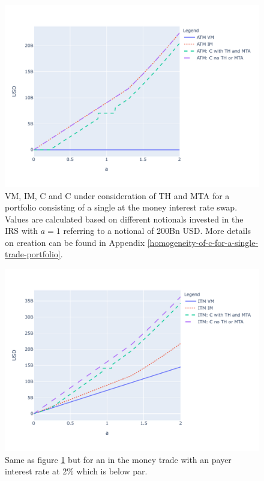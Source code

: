 \documentclass[../Thesis_AHoecherl.tex]{subfiles}
\begin{document}
    \begin{figure}
        \centering
        \includegraphics{Graphics/C_and_its_components_for_ATM_IRS.pdf}
        \caption{VM, IM, C and C under consideration of TH and MTA for a portfolio consisting of a single at the money interest rate swap. Values are calculated based on different notionals invested in the IRS with $a=1$ referring to a notional of 200Bn USD. More details on creation can be found in Appendix \ref{homogeneity-of-c-for-a-single-trade-portfolio}.}
        \label{fig:C for ATM IRS}
    \end{figure}

    \begin{figure}
        \centering
        \includegraphics{Graphics/C_and_its_components_for_ITM_IRS.pdf}
        \caption{Same as figure \ref{fig:C for ATM IRS} but for an in the money trade with an payer interest rate at 2\% which is below par.}
        \label{fig:C for ITM IRS}
    \end{figure}
\end{document}
